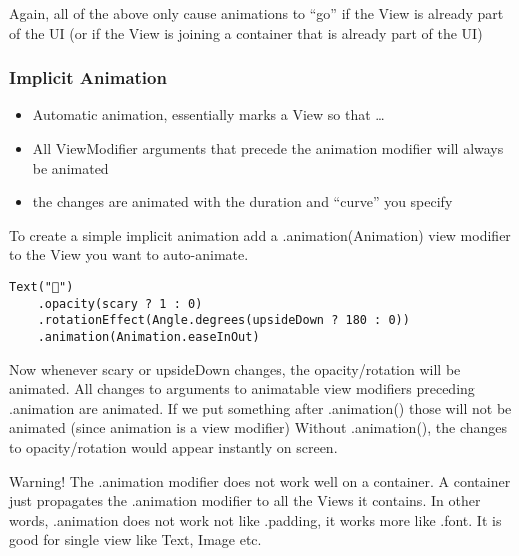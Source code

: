 \documentclass[]{article}
\providecommand{\tightlist}{%
  \setlength{\itemsep}{0pt}\setlength{\parskip}{0pt}}
\begin{document}
Again, all of the above only cause animations to ``go'' if the View is
already part of the UI (or if the View is joining a container that is
already part of the UI)

\hypertarget{implicit-animation}{%
\subsubsection{Implicit Animation}\label{implicit-animation}}

\begin{itemize}
\tightlist
\item
  Automatic animation, essentially marks a View so that \ldots{}
\item
  All ViewModifier arguments that precede the animation modifier will
  always be animated
\item
  the changes are animated with the duration and ``curve'' you specify
\end{itemize}

To create a simple implicit animation add a .animation(Animation) view
modifier to the View you want to auto-animate.

\begin{verbatim}
Text("👻")
    .opacity(scary ? 1 : 0)
    .rotationEffect(Angle.degrees(upsideDown ? 180 : 0))
    .animation(Animation.easeInOut)
\end{verbatim}

Now whenever scary or upsideDown changes, the opacity/rotation will be
animated. All changes to arguments to animatable view modifiers
preceding .animation are animated. If we put something after
.animation() those will not be animated (since animation is a view
modifier) Without .animation(), the changes to opacity/rotation would
appear instantly on screen.

Warning! The .animation modifier does not work well on a container. A
container just propagates the .animation modifier to all the Views it
contains. In other words, .animation does not work not like .padding, it
works more like .font. It is good for single view like Text, Image etc.
\end{document}
